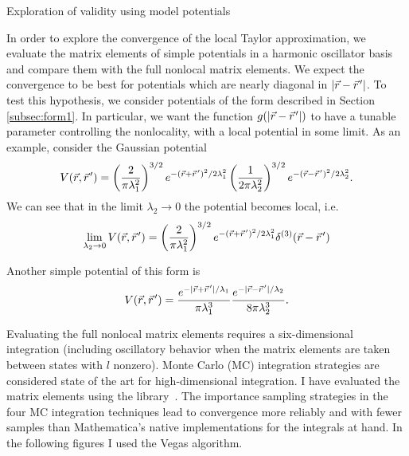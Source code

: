 \begin{section}{Exploration of validity using model potentials \label{sec:toyModel}}

In order to explore the convergence of the local Taylor approximation, we evaluate the matrix elements of simple potentials in a harmonic oscillator basis and compare them with the full nonlocal matrix elements.  We expect the convergence to be best for potentials which are nearly diagonal in $|\vec{r}-\vec{r}\mkern2mu'|$. To test this hypothesis, we consider potentials of the form described in Section \ref{subsec:form1}. In particular, we want the function $g(|\vec{r}-\vec{r}\mkern2mu'|)$ to have a tunable parameter controlling the nonlocality, with a local potential in some limit. As an example, consider the Gaussian potential
\begin{equation}\label{eq:gaussToy}
V(\vec{r},\vec{r}\mkern2mu')=\left(\frac{2}{\pi\lambda_1^2}\right)^{3/2}e^{-(\vec{r}+\vec{r}\mkern2mu')^2/2\lambda_1^2} \left(\frac{1}{2\pi\lambda_2^2}\right)^{3/2}e^{-(\vec{r}-\vec{r}\mkern2mu')^2/2\lambda_2^2}.
\end{equation}
We can see that in the limit $\lambda_2\rightarrow 0$ the potential becomes local, i.e.
\begin{equation}
\lim_{\lambda_2\rightarrow0}V(\vec{r},\vec{r}\mkern2mu')=\left(\frac{2}{\pi\lambda_1^2}\right)^{3/2}e^{-(\vec{r}+\vec{r}\mkern2mu')^2/2\lambda_1^2}\delta^{(3)}(\vec{r}-\vec{r}\mkern2mu')
\end{equation}

Another simple potential of this form is
\begin{equation}
V(\vec{r},\vec{r}\mkern2mu')=\frac{e^{-|\vec{r}+\vec{r}\mkern2mu'|/\lambda_1}}{\pi\lambda_1^3}\frac{e^{-|\vec{r}-\vec{r}\mkern2mu'|/\lambda_2}}{8\pi\lambda_2^3}.
\end{equation}

Evaluating the full nonlocal matrix elements requires a six-dimensional integration (including oscillatory behavior when the matrix elements are taken between states with $l$ nonzero). Monte Carlo (MC) integration strategies are considered state of the art for high-dimensional integration. I have evaluated the matrix elements using the {} library~\cite{Hahn200578}. The importance sampling strategies in the four MC integration techniques lead to convergence more reliably and with fewer samples than Mathematica's native implementations for the integrals at hand. In the following figures I used the {\ttfamily Vegas} algorithm.


\end{section}
